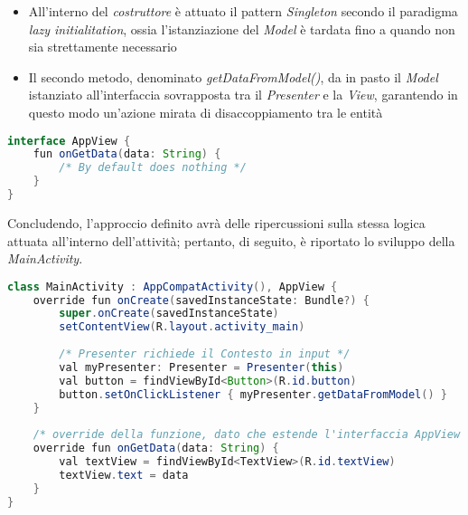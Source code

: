 \documentclass{article}
\begin{document}
\begin{itemize}[label = {-}]
    \itemsep0em
    \item All'interno del \textit{costruttore} è attuato il pattern \textit{Singleton} secondo il paradigma \textit{lazy initialitation}, ossia l'istanziazione del \textit{Model} è tardata fino a quando non sia strettamente necessario
    \item Il secondo metodo, denominato \textit{getDataFromModel()}, da in pasto il \textit{Model} istanziato all'interfaccia sovrapposta tra il \textit{Presenter} e la \textit{View}, garantendo in questo modo un'azione mirata di disaccoppiamento tra le entità
\end{itemize}
\begin{lstlisting}[language = JAVA, title = Esempio implementativo di un'interfaccia sovrapposta tra il Presenter e la View]
interface AppView {
    fun onGetData(data: String) {
        /* By default does nothing */
    }
}
\end{lstlisting}
Concludendo, l'approccio definito avrà delle ripercussioni sulla stessa logica attuata all'interno dell'attività; pertanto, di seguito, è riportato lo sviluppo della \textit{MainActivity}.
\begin{lstlisting}[language = JAVA, title = Esempio implementativo di una MainActivity che adotti il pattern MVP]
class MainActivity : AppCompatActivity(), AppView {
    override fun onCreate(savedInstanceState: Bundle?) {
        super.onCreate(savedInstanceState)
        setContentView(R.layout.activity_main)
       
        /* Presenter richiede il Contesto in input */
        val myPresenter: Presenter = Presenter(this) 
        val button = findViewById<Button>(R.id.button)
        button.setOnClickListener { myPresenter.getDataFromModel() }
    }
    
    /* override della funzione, dato che estende l'interfaccia AppView */
    override fun onGetData(data: String) {
        val textView = findViewById<TextView>(R.id.textView)
        textView.text = data
    }
}
\end{lstlisting}
\end{document}
